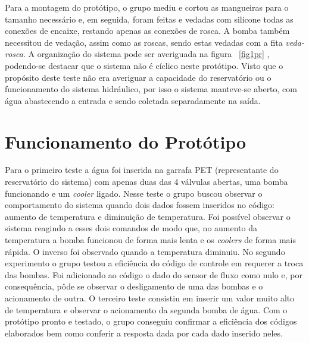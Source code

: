 \documentclass[]{report}
\begin{document}
\newpage
Para a montagem do protótipo, o grupo mediu e cortou as mangueiras para o tamanho necessário e, em seguida, foram feitas e vedadas com silicone todas as conexões de encaixe, restando apenas as conexões de rosca. A bomba também necessitou de vedação, assim como as roscas, sendo estas vedadas com a fita \emph{veda-rosca}. A organização do sistema pode ser averiguada na figura ~\ref{fig1pr} , podendo-se destacar que o sistema não é cíclico neste protótipo. Visto que o propósito deste teste não era averiguar a capacidade do reservatório ou o funcionamento do sistema hidráulico, por isso o sistema manteve-se aberto, com água abastecendo a entrada e sendo coletada separadamente na saída.
\section{Funcionamento do Protótipo}
Para o primeiro teste a água foi inserida na garrafa PET (representante do reservatório do sistema) com apenas duas das 4 válvulas abertas, uma bomba funcionando e um \textit{cooler} ligado. Nesse teste o grupo buscou observar o comportamento do sistema quando dois dados fossem inseridos no código: aumento de temperatura e diminuição de temperatura. Foi possível observar o sistema reagindo a esses dois comandos de modo que, no aumento da temperatura a bomba funcionou de forma mais lenta e os \textit{coolers} de forma mais rápida. O inverso foi observado quando a temperatura diminuiu.
No segundo experimento o grupo testou a eficiência do código de controle em requerer a troca das bombas. Foi adicionado ao código o dado do sensor de fluxo como nulo e, por consequência, pôde se observar o desligamento de uma das bombas e o acionamento de outra.  
O terceiro teste consistiu em inserir um valor muito alto de temperatura e observar o acionamento da segunda bomba de água.
Com o protótipo pronto e testado, o grupo conseguiu confirmar a eficiência dos códigos elaborados bem como conferir a resposta dada por cada dado inserido neles. 
\end{document}
